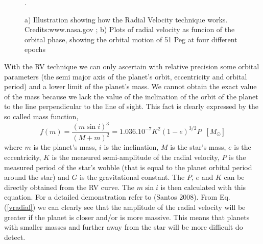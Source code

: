 \documentclass[dvips,12pt,a4paper]{report}
\begin{document}
\begin{figure}[h]
\centering
{}
\caption[The RV Technique]{a) Illustration showing how the Radial Velocity technique works. Credits:www.nasa.gov ; b) Plots of radial velocity as funcion of the orbital phase, showing the orbital motion of 51 Peg at four different epochs \citep{Mayor-1995}}.
\label{rvpic}
\end{figure}

With the RV technique we can only ascertain with relative precision some orbital parameters (the semi major axis of the planet's orbit, eccentricity and orbital period) and a lower limit of the planet's mass. We cannot obtain the exact value of the mass because we lack the value of the inclination of the orbit of the planet to the line perpendicular to the line of sight. This fact is clearly expressed by the so called mass function,
\begin{equation}
 f(m)=\frac{(m \sin i)^3}{(M+m)^2}=1.036.10^{-7}K^2(1-e)^{3/2}P\,\,\, [M_\odot]
\label {vradial}
\end{equation}
where $m$ is the planet's mass, $i$ is the inclination, $M$ is the star's mass, $e$ is the eccentricity, $K$ is the measured semi-amplitude of the radial velocity, $P$ is the measured period of the star's wobble (that is equal to the planet orbital period around the star) and $G$ is the gravitational constant. The $P$, $e$ and $K$ can be directly obtained from the RV curve. The $m \sin i$ is then calculated with this equation. For a detailed demonstration refer to (Santos 2008). From Eq. (\ref{vradial}) we can clearly see that the amplitude of the radial velocity will be greater if the planet is closer and/or is more massive. This means that planets with smaller masses and further away from the star will be more difficult do detect. 
\end{document}
